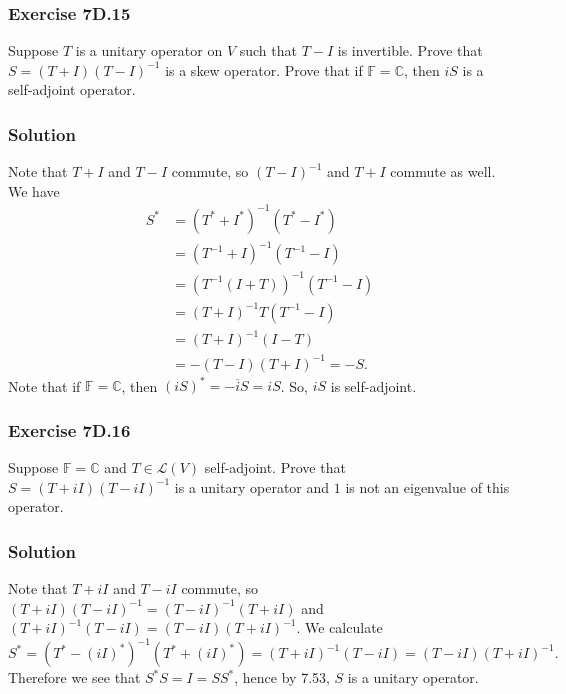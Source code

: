 \subsubsection*{Exercise 7D.15}

Suppose $T$ is a unitary operator on $V$ such that $T - I$ is invertible.
Prove that $S = (T + I)(T - I)^{-1}$ is a skew operator.
Prove that if $\mathbb{F} = \mathbb{C}$, then $iS$ is a self-adjoint operator.


\subsubsection*{Solution}

Note that $T + I$ and $T - I$ commute, so $(T - I)^{-1}$ and $T + I$ commute as well.
We have
\begin{equation*}
    \begin{split}
        S^* &= (T^* + I^*)^{-1}(T^* - I^*) \\
            &= (T^{-1} + I)^{-1}(T^{-1} - I) \\
            &= (T^{-1}(I + T))^{-1}(T^{-1} - I) \\
            &= (T + I)^{-1} T(T^{-1} - I) \\
            &= (T + I)^{-1} (I - T) \\
            &= - (T - I)(T + I)^{-1} = -S.
    \end{split}
\end{equation*}
Note that if $\mathbb{F} = \mathbb{C}$, then $(iS)^* = -\overline{i}S = iS$.
So, $iS$ is self-adjoint.


\subsubsection*{Exercise 7D.16}

Suppose $\mathbb{F} = \mathbb{C}$ and $T \in \mathcal{L}(V)$ self-adjoint.
Prove that $S = (T + iI)(T - iI)^{-1}$ is a unitary operator and $1$ is not an eigenvalue of this operator.

\subsubsection*{Solution}

Note that $T + iI$ and $T - iI$ commute, so $(T + iI)(T - iI)^{-1} = (T - iI)^{-1}(T + iI)$ and $(T + iI)^{-1}(T - iI) = (T - iI)(T + iI)^{-1}$.
We calculate
\begin{equation*}
    S^*
        = (T^* - (iI)^*)^{-1} (T^* + (iI)^*)
        = (T + iI)^{-1} (T - iI)
        = (T - iI) (T + iI)^{-1}.
\end{equation*}
Therefore we see that $S^*S = I = SS^*$, hence by 7.53, $S$ is a unitary operator.

